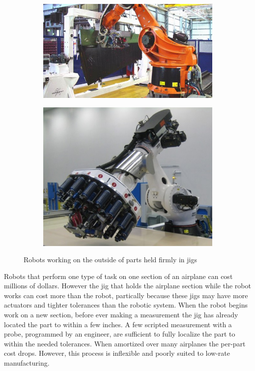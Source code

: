 \documentclass[../thesis.tex]{subfiles}
\begin{document}
\begin{figure}
  \centering
  \begin{subfigure}[b]{0.586\linewidth}
    \includegraphics[width=\linewidth]{./Introduction/Robot1Outside.jpg}    
  \end{subfigure}
  \hfill
  \begin{subfigure}[b]{0.4\linewidth}
    \includegraphics[width=\linewidth]{./Introduction/Robot2Outside.jpg}    
  \end{subfigure}
  \label{fig:KukaRobots}
  \caption{Robots working on the outside of parts held firmly in jigs}
\end{figure}

Robots that perform one type of task on one section of an airplane can cost millions of dollars.
However the jig that holds the airplane section while the robot works can cost more than the robot, partically because these jigs may have more actuators and tighter tolerances than the robotic system.
When the robot begins work on a new section, before ever making a measurement the jig has already located the part to within a few inches.
A few scripted measurement with a probe, programmed by an engineer, are sufficient to fully localize the part to within the needed tolerances.
When amortized over many airplanes the per-part cost drops.
However, this process is inflexible and poorly suited to low-rate manufacturing.
\end{document}
